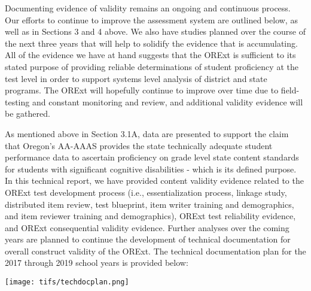 \documentclass[]{article}
\begin{document}
Documenting evidence of validity remains an ongoing and continuous
process. Our efforts to continue to improve the assessment system are
outlined below, as well as in Sections 3 and 4 above. We also have
studies planned over the course of the next three years that will help
to solidify the evidence that is accumulating. All of the evidence we
have at hand suggests that the ORExt is sufficient to its stated purpose
of providing reliable determinations of student proficiency at the test
level in order to support systems level analysis of district and state
programs. The ORExt will hopefully continue to improve over time due to
field-testing and constant monitoring and review, and additional
validity evidence will be gathered.

As mentioned above in Section 3.1A, data are presented to support the
claim that Oregon's AA-AAAS provides the state technically adequate
student performance data to ascertain proficiency on grade level state
content standards for students with significant cognitive disabilities -
which is its defined purpose. In this technical report, we have provided
content validity evidence related to the ORExt test development process
(i.e., essentialization process, linkage study, distributed item review,
test blueprint, item writer training and demographics, and item reviewer
training and demographics), ORExt test reliability evidence, and ORExt
consequential validity evidence. Further analyses over the coming years
are planned to continue the development of technical documentation for
overall construct validity of the ORExt. The technical documentation
plan for the 2017 through 2019 school years is provided below:

\FloatBarrier

\texttt{[image: tifs/techdocplan.png]}
\end{document}
